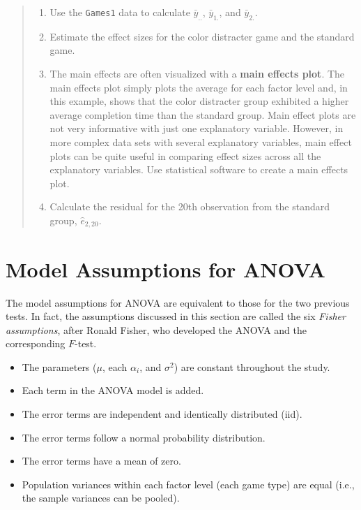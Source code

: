 \documentclass[
]{report}
\providecommand{\tightlist}{%
  \setlength{\itemsep}{0pt}\setlength{\parskip}{0pt}}
\begin{document}
\begin{quote}
\begin{enumerate}
\def\labelenumi{\arabic{enumi}.}
\setcounter{enumi}{18}
\tightlist
\item
  Use the \texttt{Games1} data to calculate \(\bar{y}_{..}\), \(\bar{y}_{1.}\), and \(\bar{y}_{2.}\).
\item
  Estimate the effect sizes for the color distracter game and the standard game.
\item
  The main effects are often visualized with a \textbf{main effects plot}. The main effects plot simply plots the average for each factor level and, in this example, shows that the color distracter group exhibited a higher average completion time than the standard group. Main effect plots are not very informative with just one explanatory variable. However, in more complex data sets with several explanatory variables, main effect plots can be quite useful in comparing effect sizes across all the explanatory variables. Use statistical software to create a main effects plot.
\item
  Calculate the residual for the 20th observation from the standard group, \(\hat{e}_{2, 20}\).
\end{enumerate}
\end{quote}

\section*{Model Assumptions for ANOVA}\label{model-assumptions-for-anova}

The model assumptions for ANOVA are equivalent to those for the two previous tests. In fact, the assumptions discussed in this section are called the six \emph{Fisher assumptions}, after Ronald Fisher, who developed the ANOVA and the corresponding \(F\)-test.

\begin{itemize}
\tightlist
\item
  The parameters (\(\mu\), each \(\alpha_i\), and \(\sigma^2\)) are constant throughout the study.
\item
  Each term in the ANOVA model is added.
\item
  The error terms are independent and identically distributed (iid).
\item
  The error terms follow a normal probability distribution.
\item
  The error terms have a mean of zero.
\item
  Population variances within each factor level (each game type) are equal (i.e., the sample variances can be pooled).
\end{itemize}
\end{document}
